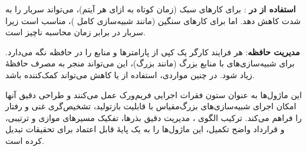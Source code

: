 \textbf{استفاده از  در }: برای کارهای سبک (زمان کوتاه به ازای هر آیتم)،  می‌تواند سربار  را به شدت کاهش دهد. اما برای کارهای سنگین (مانند شبیه‌سازی کامل )،  مناسب است زیرا سربار  در برابر زمان محاسبه ناچیز است.

\textbf{مدیریت حافظه}: هر فرایند کارگر یک کپی از پارامترها و منابع را در حافظه نگه می‌دارد. برای شبیه‌سازی‌های با منابع بزرگ (مانند  بزرگ)، این می‌تواند منجر به مصرف حافظۀ زیاد شود. در چنین مواردی، استفاده از  یا کاهش  می‌تواند کمک‌کننده باشد.

این ماژول‌ها به عنوان ستون فقرات اجرایی فریم‌ورک  عمل می‌کنند و طراحی دقیق آنها امکان اجرای شبیه‌سازی‌های بزرگ‌مقیاس با قابلیت بازتولید، تشخیص‌گری غنی و رفتار  را فراهم می‌کند. ترکیب الگوی ، مدیریت دقیق بذرها، تفکیک مسیرهای موازی و ترتیبی، و قرارداد واضح تکمیل، این ماژول‌ها را به یک پایۀ قابل اعتماد برای تحقیقات  تبدیل کرده است.
